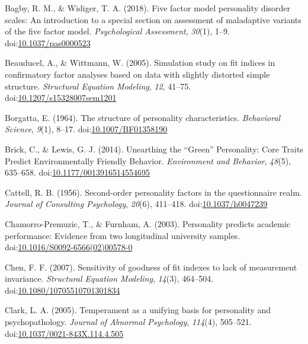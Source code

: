 \documentclass[,man]{apa6}
\theoremstyle{definition}
\theoremstyle{definition}
\theoremstyle{definition}
\theoremstyle{remark}
\begin{document}
\leavevmode\hypertarget{ref-Bagby2018}{}%
Bagby, R. M., \& Widiger, T. A. (2018). Five factor model personality
disorder scales: An introduction to a special section on assessment of
maladaptive variants of the five factor model. \emph{Psychological
Assessment}, \emph{30}(1), 1--9.
doi:\href{https://doi.org/10.1037/pas0000523}{10.1037/pas0000523}

\leavevmode\hypertarget{ref-Beauducel2005}{}%
Beauducel, A., \& Wittmann, W. (2005). Simulation study on fit indices
in confirmatory factor analyses based on data with slightly distorted
simple structure. \emph{Structural Equation Modeling}, \emph{12},
41--75.
doi:\href{https://doi.org/10.1207/s15328007sem1201}{10.1207/s15328007sem1201}

\leavevmode\hypertarget{ref-Borgatta1964}{}%
Borgatta, E. (1964). The structure of personality characteristics.
\emph{Behavioral Science}, \emph{9}(1), 8--17.
doi:\href{https://doi.org/10.1007/BF01358190}{10.1007/BF01358190}

\leavevmode\hypertarget{ref-Brick2014}{}%
Brick, C., \& Lewis, G. J. (2014). Unearthing the ``Green'' Personality:
Core Traits Predict Environmentally Friendly Behavior. \emph{Environment
and Behavior}, \emph{48}(5), 635--658.
doi:\href{https://doi.org/10.1177/0013916514554695}{10.1177/0013916514554695}

\leavevmode\hypertarget{ref-Cattell1956}{}%
Cattell, R. B. (1956). Second-order personality factors in the
questionnaire realm. \emph{Journal of Consulting Psychology},
\emph{20}(6), 411--418.
doi:\href{https://doi.org/10.1037/h0047239}{10.1037/h0047239}

\leavevmode\hypertarget{ref-Chamorro-Premuzic2003}{}%
Chamorro-Premuzic, T., \& Furnham, A. (2003). Personality predicts
academic performance: Evidence from two longitudinal university samples.
doi:\href{https://doi.org/10.1016/S0092-6566(02)00578-0}{10.1016/S0092-6566(02)00578-0}

\leavevmode\hypertarget{ref-Chen2007}{}%
Chen, F. F. (2007). Sensitivity of goodness of fit indexes to lack of
measurement invariance. \emph{Structural Equation Modeling},
\emph{14}(3), 464--504.
doi:\href{https://doi.org/10.1080/10705510701301834}{10.1080/10705510701301834}

\leavevmode\hypertarget{ref-Clark2005}{}%
Clark, L. A. (2005). Temperament as a unifying basis for personality and
psychopathology. \emph{Journal of Abnormal Psychology}, \emph{114}(4),
505--521.
doi:\href{https://doi.org/10.1037/0021-843X.114.4.505}{10.1037/0021-843X.114.4.505}
\end{document}
